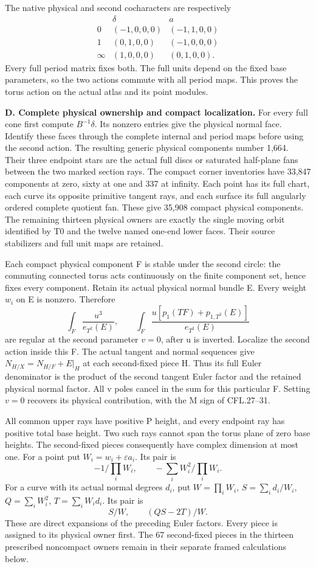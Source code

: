 The native physical and second cocharacters are respectively
\[
\begin{array}{c|cc}
&\delta&a\\\hline
0&(-1,0,0,0)&(-1,1,0,0)\\
1&(0,1,0,0)&(-1,0,0,0)\\
\infty&(1,0,0,0)&(0,1,0,0).
\end{array}
\]
Every full period matrix fixes both.  The full units depend on the fixed
base parameters, so the two actions commute with all period maps.  This
proves the torus action on the actual atlas and its point modules.

\medskip\noindent\textbf{D. Complete physical ownership and compact localization.}
For every full cone first compute \(B^{-1}\delta\).  Its nonzero entries
give the physical normal face.  Identify these faces through the complete
internal and period maps before using the second action.  The resulting
generic physical components number 1,664.  Their three endpoint stars are
the actual full discs or saturated half-plane fans between the two marked
section rays.  The compact corner inventories have 33,847 components at
zero, sixty at one and 337 at infinity.  Each point has its full chart,
each curve its opposite primitive tangent rays, and each surface its full
angularly ordered complete quotient fan.  These give 35,908 compact
physical components.  The remaining thirteen physical owners are exactly
the single moving orbit identified by T0 and the twelve named one-end
lower faces.  Their source stabilizers and full unit maps are retained.

Each compact physical component F is stable under the second circle:
the commuting connected torus acts continuously on the finite component
set, hence fixes every component.  Retain its actual physical normal
bundle E.  Every weight \(w_i\) on E is nonzero.  Therefore
\[
\int_F\frac{u^3}{e_{T^2}(E)},\qquad
\int_F\frac{u[p_1(TF)+p_{1,T^2}(E)]}{e_{T^2}(E)}
\]
are regular at the second parameter \(v=0\), after u is inverted.
Localize the second action inside this F.  The actual tangent and normal
sequences give
\(N_{H/X}=N_{H/F}+E|_H\) at each second-fixed piece H.  Thus its full
Euler denominator is the product of the second tangent Euler factor and
the retained physical normal factor.  All v poles cancel in the sum for
this particular F.  Setting \(v=0\) recovers its physical contribution,
with the M sign of CFL.27--31.

All common upper rays have positive P height, and every endpoint ray has
positive total base height.  Two such rays cannot span the torus plane
of zero base heights.  The second-fixed pieces consequently have complex
dimension at most one.  For a point put
\(W_i=w_i+\varepsilon a_i\).  Its pair is
\[
-1/\prod_iW_i,\qquad-\sum_iW_i^2/\prod_iW_i.
\]
For a curve with its actual normal degrees \(d_i\), put
\(W=\prod_iW_i\), \(S=\sum_i d_i/W_i\),
\(Q=\sum_iW_i^2\), \(T=\sum_iW_id_i\).  Its pair is
\[
S/W,\qquad(QS-2T)/W.
\]
These are direct expansions of the preceding Euler factors.  Every
piece is assigned to its physical owner first.  The 67 second-fixed
pieces in the thirteen prescribed noncompact owners remain in their
separate framed calculations below.

